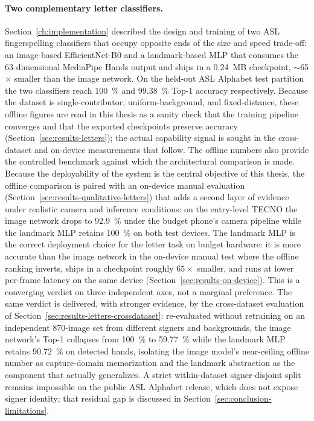 \paragraph{Two complementary letter classifiers.}
Section~\ref{ch:implementation} described the design and training of
two ASL fingerspelling classifiers that occupy opposite ends of the
size and speed trade-off: an image-based EfficientNet-B0 and a
landmark-based MLP that consumes the 63-dimensional MediaPipe Hands
output and ships in a \SI{0.24}{MB} checkpoint, \(\sim\)65$\times$
smaller than the image network. On the held-out ASL Alphabet test
partition the two classifiers reach \SI{100}{\percent} and
\SI{99.38}{\percent} Top-1 accuracy respectively. Because the
dataset is single-contributor, uniform-background, and
fixed-distance, these offline figures are read in this thesis as a
sanity check that the training pipeline converges and that the
exported checkpoints preserve accuracy
(Section~\ref{sec:results-letters}); the actual capability signal
is sought in the cross-dataset and on-device measurements that follow. The offline
numbers also provide the controlled benchmark against which the
architectural comparison is made. Because the
deployability of the system is the central objective of this
thesis, the offline comparison is paired with an on-device manual
evaluation
(Section~\ref{sec:results-qualitative-letters}) that adds a second
layer of evidence under realistic camera and inference conditions:
on the entry-level TECNO the image network drops to
\SI{92.9}{\percent} under the budget phone's camera pipeline while
the landmark MLP retains \SI{100}{\percent} on both test devices.
The landmark MLP is the correct deployment choice for the letter
task on budget hardware: it is more accurate than the image
network in the on-device manual test where the offline ranking
inverts, ships in a checkpoint roughly $65\times$ smaller, and
runs at lower per-frame latency on the same device
(Section~\ref{sec:results-on-device}). This is a converging
verdict on three independent axes, not a marginal preference. The
same verdict is delivered, with stronger evidence, by the
cross-dataset evaluation of
Section~\ref{sec:results-letters-crossdataset}: re-evaluated without
retraining on an independent \num{870}-image set from different
signers and backgrounds, the image network's Top-1 collapses from
\SI{100}{\percent} to \SI{59.77}{\percent} while the landmark MLP
retains \SI{90.72}{\percent} on detected hands, isolating the image
model's near-ceiling offline number as capture-domain memorization
and the landmark abstraction as the component that actually
generalizes. A strict within-dataset signer-disjoint split remains
impossible on the public ASL Alphabet release, which does not expose
signer identity; that residual gap is discussed in
Section~\ref{sec:conclusion-limitations}.

